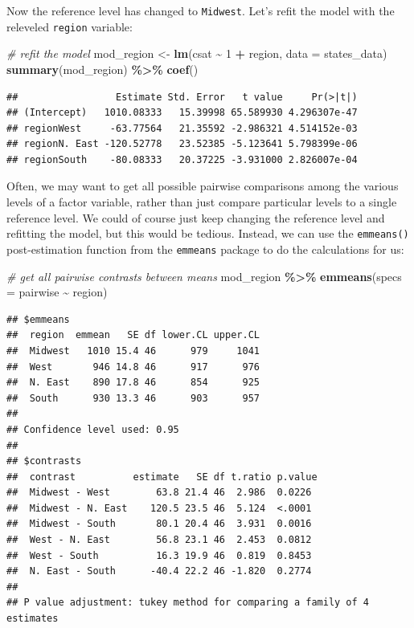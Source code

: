\documentclass[
]{book}
\newenvironment{Shaded}{\begin{snugshade}}{\end{snugshade}}
\newcommand{\CommentTok}[1]{\textcolor[rgb]{0.56,0.35,0.01}{\textit{#1}}}
\newcommand{\DataTypeTok}[1]{\textcolor[rgb]{0.13,0.29,0.53}{#1}}
\newcommand{\DecValTok}[1]{\textcolor[rgb]{0.00,0.00,0.81}{#1}}
\newcommand{\KeywordTok}[1]{\textcolor[rgb]{0.13,0.29,0.53}{\textbf{#1}}}
\newcommand{\NormalTok}[1]{#1}
\newcommand{\OperatorTok}[1]{\textcolor[rgb]{0.81,0.36,0.00}{\textbf{#1}}}
\newcommand{\StringTok}[1]{\textcolor[rgb]{0.31,0.60,0.02}{#1}}
\begin{document}
Now the reference level has changed to \texttt{Midwest}. Let's refit the model with the releveled \texttt{region} variable:

\begin{Shaded}
\begin{Highlighting}[]
  \CommentTok{\# refit the model}
\NormalTok{  mod\_region \textless{}{-}}\StringTok{ }\KeywordTok{lm}\NormalTok{(csat }\OperatorTok{\textasciitilde{}}\StringTok{ }\DecValTok{1} \OperatorTok{+}\StringTok{ }\NormalTok{region, }\DataTypeTok{data =}\NormalTok{ states\_data)}
  \KeywordTok{summary}\NormalTok{(mod\_region) }\OperatorTok{\%\textgreater{}\%}\StringTok{ }\KeywordTok{coef}\NormalTok{()}
\end{Highlighting}
\end{Shaded}

\begin{verbatim}
##                 Estimate Std. Error   t value     Pr(>|t|)
## (Intercept)   1010.08333   15.39998 65.589930 4.296307e-47
## regionWest     -63.77564   21.35592 -2.986321 4.514152e-03
## regionN. East -120.52778   23.52385 -5.123641 5.798399e-06
## regionSouth    -80.08333   20.37225 -3.931000 2.826007e-04
\end{verbatim}

Often, we may want to get all possible pairwise comparisons among the various levels of a factor variable, rather than just compare particular levels to a single reference level. We could of course just keep changing the reference level and refitting the model, but this would be tedious. Instead, we can use the \texttt{emmeans()} post-estimation function from the \texttt{emmeans} package to do the calculations for us:

\begin{Shaded}
\begin{Highlighting}[]
  \CommentTok{\# get all pairwise contrasts between means}
\NormalTok{  mod\_region }\OperatorTok{\%\textgreater{}\%}
\StringTok{      }\KeywordTok{emmeans}\NormalTok{(}\DataTypeTok{specs =}\NormalTok{ pairwise }\OperatorTok{\textasciitilde{}}\StringTok{ }\NormalTok{region)}
\end{Highlighting}
\end{Shaded}

\begin{verbatim}
## $emmeans
##  region  emmean   SE df lower.CL upper.CL
##  Midwest   1010 15.4 46      979     1041
##  West       946 14.8 46      917      976
##  N. East    890 17.8 46      854      925
##  South      930 13.3 46      903      957
## 
## Confidence level used: 0.95 
## 
## $contrasts
##  contrast          estimate   SE df t.ratio p.value
##  Midwest - West        63.8 21.4 46  2.986  0.0226 
##  Midwest - N. East    120.5 23.5 46  5.124  <.0001 
##  Midwest - South       80.1 20.4 46  3.931  0.0016 
##  West - N. East        56.8 23.1 46  2.453  0.0812 
##  West - South          16.3 19.9 46  0.819  0.8453 
##  N. East - South      -40.4 22.2 46 -1.820  0.2774 
## 
## P value adjustment: tukey method for comparing a family of 4 estimates
\end{verbatim}
\end{document}
